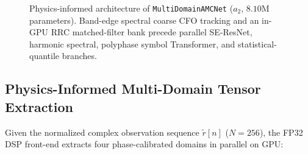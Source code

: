 \begin{figure}[!t]
{%
}
\caption{Physics-informed architecture of \texttt{MultiDomainAMCNet} ($a_2$, $8.10\text{M}$ parameters). Band-edge spectral coarse CFO tracking and an in-GPU RRC matched-filter bank precede parallel SE-ResNet, harmonic spectral, polyphase symbol Transformer, and statistical-quantile branches.}
\label{fig:multidomain_architecture}
\end{figure}

\subsection{Physics-Informed Multi-Domain Tensor Extraction}
\label{subsec:tensor_extraction}

Given the normalized complex observation sequence $\tilde{r}[n]$ ($N=256$), the FP32 DSP front-end extracts four phase-calibrated domains in parallel on GPU:

